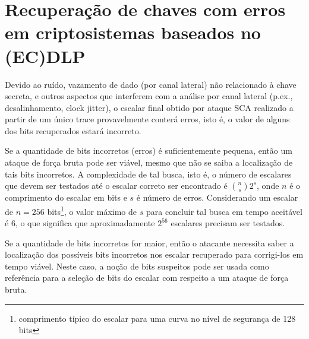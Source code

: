 
\section{Recuperação de chaves com erros em criptosistemas baseados no (EC)DLP}

%
Devido ao ruído, vazamento de dado (por canal lateral) não relacionado à chave secreta, e outros aspectos que interferem com a análise por canal lateral (p.ex., desalinhamento, clock jitter), o escalar final obtido por ataque SCA realizado a partir de um único trace provavelmente conterá erros, isto é, o valor de alguns dos bits recuperados estará incorreto.

%
%
Se a quantidade de bits incorretos (erros) é suficientemente pequena, então um ataque de força bruta pode ser viável, mesmo que não se saiba a localização de tais bits incorretos. A complexidade de tal busca, isto é, o número de escalares que devem ser testados até o escalar correto ser encontrado é ${{n}\choose{s}} 2^s$, onde $n$ é o comprimento do escalar em bits e $s$ é número de erros. Considerando um escalar de $n = 256$ bits\footnote{comprimento típico do escalar para uma curva no nível de segurança de 128 bits}, o valor máximo de $s$ para concluir tal busca em tempo aceitável é 6, o que significa que aproximadamente $2^{56}$ escalares precisam ser testados.

%
%
Se a quantidade de bits incorretos for maior, então o atacante necessita saber a localização dos possíveis bits incorretos nos escalar recuperado para corrigi-los em tempo viável.
%
%
Neste caso, a noção de bits suspeitos pode ser usada como referência para a seleção de bits do escalar com respeito a um ataque de força bruta. 
%

\newcommand{\scalarlen}{254}


